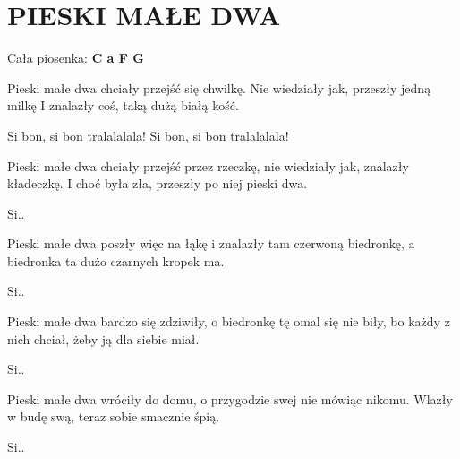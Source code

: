 \documentclass[../../../songbook.tex]{subfiles}
\begin{document}
\TabPositions{8cm} %
\section*{PIESKI MAŁE DWA}
{}
\vspace{0.5cm}
Cała piosenka:{\color{red}\textbf{ C a F G} } \newline

Pieski małe dwa chciały przejść się chwilkę. 		 \newline
Nie wiedziały jak, przeszły jedną milkę 		 \newline
I znalazły coś, taką dużą białą kość. 		 \newline

\-\hspace{1cm} Si bon, si bon tralalalala! 		 \newline
\-\hspace{1cm} Si bon, si bon tralalalala! 		 \newline

Pieski małe dwa chciały przejść przez rzeczkę, 		 \newline
nie wiedziały jak, znalazły kładeczkę. 		 \newline
I choć była zła, przeszły po niej pieski dwa. 		 \newline

\-\hspace{1cm} Si..  		 \newline

Pieski małe dwa poszły więc na łąkę 		 \newline
i znalazły tam czerwoną biedronkę, 		 \newline
a biedronka ta dużo czarnych kropek ma. 		 \newline

\-\hspace{1cm} Si..  		 \newline

Pieski małe dwa bardzo się zdziwiły, 		 \newline
o biedronkę tę omal się nie biły, 		 \newline
bo każdy z nich chciał, żeby ją dla siebie miał. 		 \newline

\-\hspace{1cm} Si..  		 \newline

Pieski małe dwa wróciły do domu, 		 \newline
o przygodzie swej nie mówiąc nikomu. 		 \newline
Wlazły w budę swą, teraz sobie smacznie śpią.		 \newline

\-\hspace{1cm} Si..  		 \newline
\end{document}
